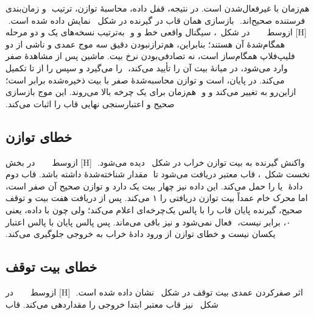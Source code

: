 ‫هم‌زمان با غیرفعال‌شدن  است. در نتیجه، قفل داده، محاسبهٔ توازن، ترتیب
‫ و زمان‌بندی فرستنده صحیح‌اند.
‫
‫بازسازی همان قاب در گیرنده در شکل~ نمایش داده شده است.
‫
‫[H]
‫‌ازوسط
‫
‫
‫
‫
‫
‫در شکل~،  سیگنال واقعی خط و  و
‫ به‌ترتیب نسخه‌های یک و دو مرحله همگام‌شدهٔ آن هستند؛ بنابراین،
‫هم‌ترازنبودن دقیق سه موج عمدی و ناشی از دو فلیپ‌فلاپ همگام‌ساز است، نه تصادفی‌بودن نرخ
‫بیت. ماشین پس از مشاهدهٔ صفر وارد  می‌شود، در میانهٔ بیت آن را تأیید می‌کند،
‫ را می‌گیرد و سپس  را از  تا 
‫تکمیل می‌کند. در پایان،  است و توازن محاسبه‌شدهٔ صفر با بیت ذخیره‌شده برابر
‫است؛ ازاین‌رو  به  تغییر می‌کند و  و
‫ هم‌زمان برای یک چرخه بالا می‌روند. این موج بازسازی صحیح و
‫اعتبارسنجی نهایی قاب را اثبات می‌کند.
‫
‫
‫\subsection{خطای توازن}
‫
‫واکنش گیرنده به بیت توازن خراب در شکل~ دیده می‌شود.
‫
‫[H]
‫‌ازوسط
‫
‫
‫
‫
‫
‫در بخش نخست شکل~، قاب  معتبر دریافت می‌شود تا
‫ مقدار شناخته‌شدهٔ  داشته باشد. قاب دوم دادهٔ
‫ یا  را حمل می‌کند. این داده نیز چهار بیت یک دارد و توازن
‫صحیح آن صفر است، اما محرک خام عمداً بیت توازن دریافتی را ۱ می‌کند. پس از دریافت هفت بیت
‫و توقف صحیح، گیرنده پایان قاب را با پالس یک‌چرخه‌ای  اعلام می‌کند؛
‫ولی چون  با  داده، یعنی ۰، برابر نیست،
‫ فعال نمی‌شود و  نیز  باقی می‌ماند. پس
‫پالس پایان با پالس اعتبار یکسان نیست و خطای توازن از ورود دادهٔ خراب به خروجی جلوگیری
‫می‌کند.
‫
‫
‫\subsection{خطای بیت توقف}
‫
‫اثر صفرکردن عمدی بیت توقف در شکل~ نشان داده شده است.
‫
‫[H]
‫‌ازوسط
‫
‫
‫
‫
‫
‫در شکل~ نیز قاب معتبر  ابتدا خروجی را مقداردهی می‌کند. قاب
